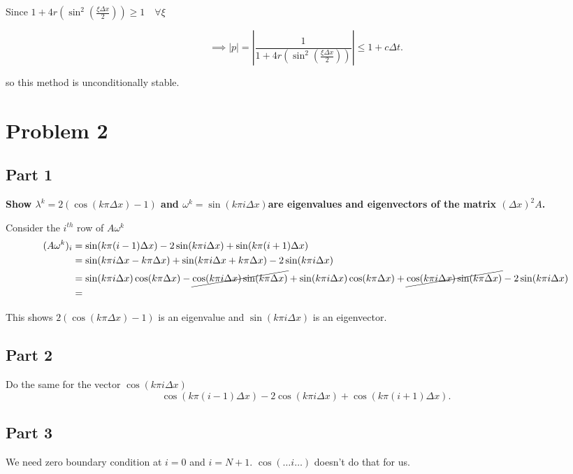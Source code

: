 \documentclass{article}
\begin{document}
Since $1 + 4r \left( \sin^2(
\frac{\xi\Delta x}{2})\right) \geq 1 \quad \forall\xi$

\[
\implies |p| = \left|\frac{1}{1 + 4r \left( \sin^2( \frac{\xi\Delta
x}{2})\right) } \right| \leq 1 + c\Delta t
.\] 

\vspace{15px}
\par so this method is unconditionally stable.

\section{Problem 2}%
\label{sec:problem_2}

\subsection{Part 1}%
\label{sub:part_1}

\textbf{Show $\lambda^{k} = 2(\cos(k\pi \Delta x) - 1)$ and $\omega^{k}
= \sin(k\pi i \Delta x) $are eigenvalues and eigenvectors of the matrix $(
\Delta x)^{2}A$.} 
\vspace{15px}

\par Consider the $i^{th}$ row of $A \omega^{k}$
\begin{align*}
  (A \omega^{k})_{i} &= \sin(k\pi(i-1)\Delta x) - 2\sin(k\pi i\Delta x)
  + \sin(k\pi (i+1)\Delta x) \\ 
                     &= \sin(k\pi i \Delta x - k\pi \Delta x) + \sin(k\pi
                     i \Delta x + k\pi\Delta x) - 2\sin(k\pi i \Delta x) \\
                     &= \sin(k\pi i \Delta x)\cos(k\pi \Delta x)
                     - \cancel{\cos(k\pi i \Delta x)\sin(k\pi \Delta x)}
                     + \sin(k\pi i \Delta x)\cos(k\pi \Delta x)
                     +\cancel{\cos(k\pi i \Delta x)\sin(k\pi \Delta x)}
                     - 2\sin(k\pi i \Delta x)\\
                     &=  \\
\end{align*}

This shows $2(\cos(k\pi \Delta x) - 1)$ is an eigenvalue and $\sin(k\pi
i \Delta x)$ is an eigenvector.


\subsection{Part 2}%
\label{sub:part_2}

Do the same for the vector $\cos(k\pi i \Delta x)$
\[
  \cos(k\pi(i-1)\Delta x) - 2\cos(k\pi i\Delta x) + \cos(k\pi(i+1) \Delta x)
.\] 

\subsection{Part 3}%
\label{sub:part_3}

We need zero boundary condition at $i=0$ and $i = N+1$.  $\cos(\dots i \dots)$ doesn't do that for us.
\end{document}
